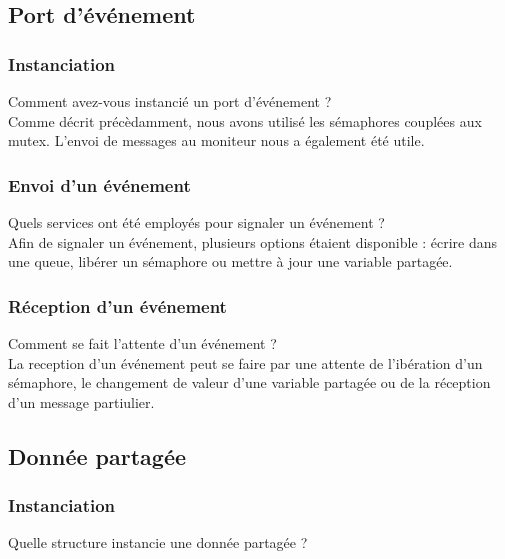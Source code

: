 \documentclass[11pt, a4paper]{paper}
\begin{document}
{{{ %
\subsection{Port d’événement}

\subsubsection{Instanciation}
 {\color{blue} Comment avez-vous instancié un port d'événement ?}\\
 
 {\color{black} Comme décrit précèdamment, nous avons utilisé les sémaphores couplées aux mutex. L'envoi de messages au moniteur nous a également été utile.}
 
\subsubsection{Envoi d’un événement}
 {\color{blue} Quels services ont été employés pour signaler un événement ?} \\
 
 {\color{black} Afin de signaler un événement, plusieurs options étaient disponible : écrire dans une queue, libérer un sémaphore ou mettre à jour une variable partagée.}

\subsubsection{Réception d’un événement}
 {\color{blue} Comment se fait l'attente d'un événement ?}\\
 
 {\color{black} La reception d'un événement peut se faire par une attente de l'ibération d'un sémaphore, le changement de valeur d'une variable partagée ou de la réception d'un message partiulier. }

\subsection{Donnée partagée}

\subsubsection{Instanciation}
 {\color{blue} Quelle structure instancie une donnée partagée ?}
 
}}}
\end{document}
